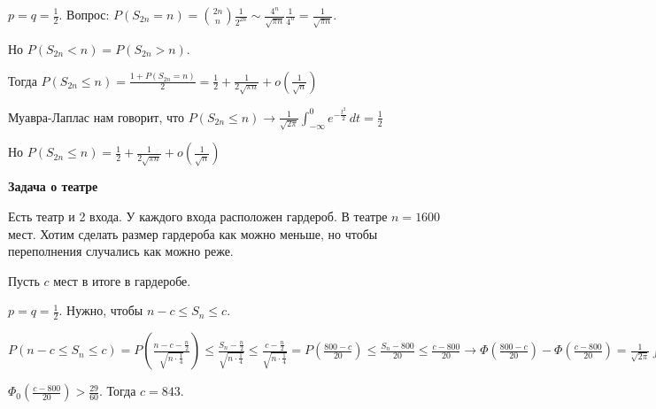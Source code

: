 \begin{example}
    $p = q = \frac{1}{2}$. Вопрос: $P(S_{2n} = n) = \binom{2n}{n} \frac{1}{2^{2n}} \sim 
    \frac{4^n}{\sqrt{\pi n}} \frac{1}{4^n} = \frac{1}{\sqrt{\pi n}}$.

    Но $P(S_{2n} < n) = P(S_{2n} > n)$.
    
    Тогда $P(S_{2n} \leqslant n) = \frac{1 + P(S_{2n} = n)}{2} = \frac{1}{2} + \frac{1}{2\sqrt{\pi n}} + o(\frac{1}{\sqrt{n}})$

    Муавра-Лаплас нам говорит, что $P(S_{2n} \leqslant n) \to \frac{1}{\sqrt{2\pi}} \int_{-\infty}^0 e^{-\frac{t^2}{2}} \, dt = \frac{1}{2}$

    Но $P(S_{2n} \leqslant n) = \frac{1}{2} + \frac{1}{2\sqrt{\pi n}} + o(\frac{1}{\sqrt{n}})$
\end{example}

\begin{example}
    \textbf{Задача о театре}

    Есть театр и 2 входа. У каждого входа расположен гардероб. 
    В театре $n = 1600$ мест. Хотим сделать размер гардероба как можно меньше, но чтобы
    переполнения случались как можно реже.

    Пусть $c$ мест в итоге в гардеробе.

    $p = q = \frac{1}{2}$. Нужно, чтобы $n - c \leqslant S_n \leqslant c$. 

    $P(n - c \leqslant S_n \leqslant c) = P(\frac{n - c - \frac{n}{2}}{\sqrt{n \cdot \frac{1}{4}}})
    \leqslant \frac{S_n - \frac{n}{2}}{\sqrt{n \cdot \frac{1}{4}}} \leqslant \frac{c - \frac{n}{2}}{\sqrt{n \cdot \frac{1}{4}}} =
    P(\frac{800 - c}{20}) \leqslant \frac{S_n - 800}{20} \leqslant \frac{c - 800}{20} \to \Phi (\frac{800 - c}{20}) - \Phi (\frac{c - 800}{20}) =
    \frac{1}{\sqrt{2\pi}} \int_{\frac{800 - c}{20}}^{\frac{c - 800}{20}} e^{-\frac{t^2}{2}} \, dt > \frac{29}{30}$

    $\Phi_0 (\frac{c - 800}{20}) > \frac{29}{60}$. Тогда $c = 843$.

\end{example}


